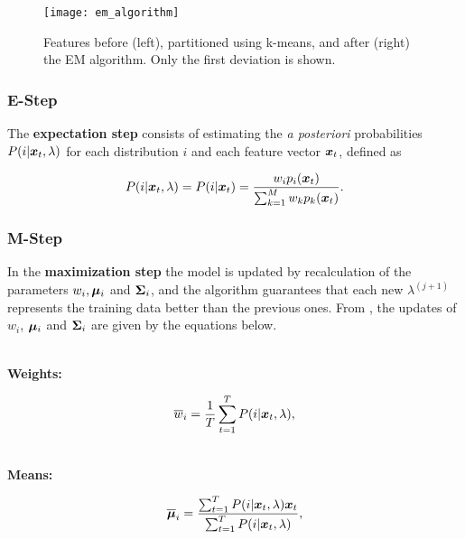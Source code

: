 \begin{figure}[ht]
    \centering
    \texttt{[image: em\_algorithm]}
    \caption{Features before (left), partitioned using k-means, and after (right) the EM algorithm. Only the first deviation is shown.}
    \label{fig:em_algorithm}
\end{figure}

\subsubsection*{E-Step}

The \textbf{expectation step} consists of estimating the \emph{a posteriori} probabilities $P(i|\boldsymbol{x}_t, \lambda)$ for each distribution $i$ and each feature vector $\boldsymbol{x}_t$, defined as

\begin{equation}
    \postprob{i}{\dvec{x}_t, \lambda} = \postprob{i}{\dvec{x}_t} = \frac{w_i p_i(\dvec{x}_t)}{\sum_{k=1}^M w_k p_k(\dvec{x}_t)}.
    \label{eq:e-step-posterior}
\end{equation}

\subsubsection*{M-Step}

In the \textbf{maximization step} the model is updated by recalculation of the parameters $w_i, \boldsymbol{\mu}_i$ and $\boldsymbol{\Sigma}_i$, and the algorithm guarantees that each new $\lambda^{(j+1)}$ represents the training data better than the previous ones. From , the updates of $w_i$, $\boldsymbol{\mu}_i$ and $\boldsymbol{\Sigma}_i$ are given by the equations below.

\noindent\\\textbf{Weights:}

\begin{equation}
    \overline{w}_i = \frac{1}{T} \sum_{t=1}^T \postprob{i}{\dvec{x}_t, \lambda},
    \label{eq:m-step-weight}
\end{equation}

\noindent\\\textbf{Means:}

\begin{equation}
    \overline{\dvec{\mu}}_i = \frac{\sum_{t=1}^T \postprob{i}{\dvec{x}_t, \lambda} \dvec{x}_t}{\sum_{t=1}^T \postprob{i}{\dvec{x}_t, \lambda}},
    \label{eq:m-step-means}
\end{equation}

